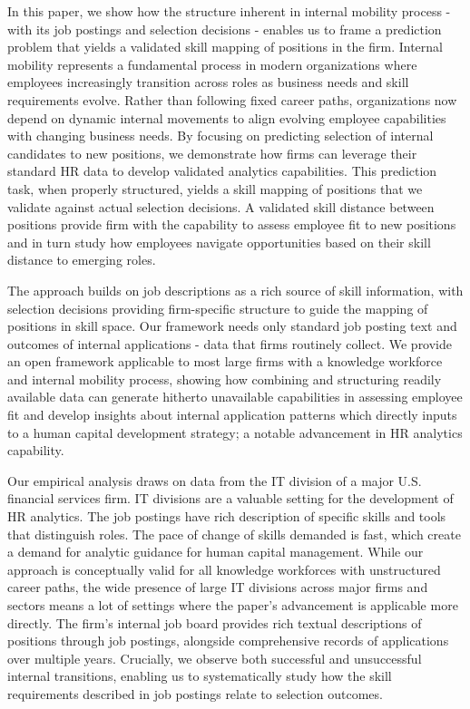 \documentclass{article}
\begin{document}
In this paper, we show how the structure inherent in internal mobility process - with its job postings and selection decisions - enables us to frame a prediction problem that yields a validated skill mapping of positions in the firm. Internal mobility represents a fundamental process in modern organizations where employees increasingly transition across roles as business needs and skill requirements evolve. Rather than following fixed career paths, organizations now depend on dynamic internal movements to align evolving employee capabilities with changing business needs. By focusing on predicting selection of internal candidates to new positions, we demonstrate how firms can leverage their standard HR data to develop validated analytics capabilities. This prediction task, when properly structured, yields a skill mapping of positions that we validate against actual selection decisions. A validated skill distance between positions provide firm with the capability to assess employee fit to new positions and in turn study how employees navigate opportunities based on their skill distance to emerging roles.


The approach builds on job descriptions as a rich source of skill information, with selection decisions providing firm-specific structure to guide the mapping of positions in skill space. Our framework needs only standard job posting text and outcomes of internal applications - data that firms routinely collect. We provide an open framework applicable to most large firms with a knowledge workforce and internal mobility process, showing how combining and structuring readily available data can generate hitherto unavailable capabilities in assessing employee fit and develop insights about internal application patterns which directly inputs to a human capital development strategy; a notable advancement in HR analytics capability. 


Our empirical analysis draws on data from the IT division of a major U.S. financial services firm. IT divisions are a valuable setting for the development of HR analytics. The job postings have rich description of specific skills and tools that distinguish roles. The pace of change of skills demanded is fast, which create a demand for analytic guidance for human capital management. While our approach is conceptually valid for all knowledge workforces with unstructured career paths, the wide presence of large IT divisions across major firms and sectors \parencite{Cyberstates2024} means a lot of settings where the paper’s advancement is applicable more directly. The firm's internal job board provides rich textual descriptions of positions through job postings, alongside comprehensive records of applications over multiple years. Crucially, we observe both successful and unsuccessful internal transitions, enabling us to systematically study how the skill requirements described in job postings relate to selection outcomes.
\end{document}

